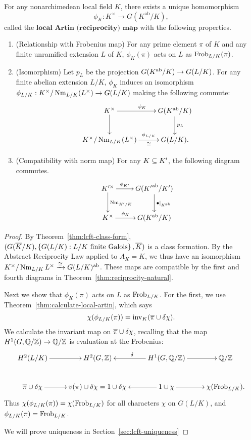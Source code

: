 \begin{thm*}
For any nonarchimedean local field $K$, there exists a unique homomorphism
\[
\phi_K:K^{\times} \to G(K^{\text{ab}}/K),
\]
called the $\textbf{local Artin (reciprocity) map}$
with the following properties.
\begin{enumerate}
\item (Relationship with Frobenius map)
For any prime element $\pi$ of $K$ and any finite unramified extension $L$ of $K$, $\phi_K(\pi)$ acts on $L$ as $\operatorname{Frob}_{L/K}(\pi)$.
\item (Isomorphism)
Let $p_{L}$ be the projection $G(K^{\text{ab}}/K)\to G(L/K)$. For any finite abelian extension $L/K$, %
$\phi_K$ induces an isomorphism $\phi_{L/K}:K^{\times}/\operatorname{Nm}_{L/K}(L^{\times})\to G(L/K)$ making the following commute:
\[
\xymatrix{
K^{\times} \ar[r]^{\phi_K}\ar[d] & G(K^{\text{ab}}/K)\ar[d]^{p_L}\\
K^{\times}/\nm_{L/K}(L^{\times})\ar[r]^-{\phi_{L/K}}_-{\cong} & G(L/K).
}
\]
\item (Compatibility with norm map) For any $K\subseteq K'$, the following diagram commutes.
\[
\xymatrix{
K'^{\times} \ar[r]^-{\phi_{K'}} \ar[d]^{\nm_{K'/K}} & G({K'}\abe/K')\ar[d]^{\bullet|_{K\abe}}\\
K^{\times} \ar[r]^-{\phi_{K}}& G(K\abe/K)
}
\]
\end{enumerate}
\end{thm*}
\begin{proof}
By Theorem~\ref{thm:lcft-class-form}, $(G(\overline{K}/K),\left\{{G(L/K)}:{L/K\text{ finite Galois}}\right\},\overline{K})$ is a class formation. By the Abstract Reciprocity Law applied to $A_K=K$, we thus have an isomorphism $K^{\times}/\operatorname{Nm}_{L/K}L^{\times}\xrightarrow{\cong} G(L/K)^{\text{ab}}$. These maps are compatible by the first and fourth diagrams in Theorem~\ref{thm:reciprocity-natural}.

Next we show that $\phi_K(\pi)$ acts on $L$ as $\operatorname{Frob}_{L/K}$. For the first, we use Theorem~\ref{thm:calculate-local-artin}, which says
\[
\chi(\phi_{L/K}(\pi))=\operatorname{inv}_K(\overline{\pi}\cup \delta \chi).
\]
We calculate the invariant map on $\overline{\pi}\cup \delta \chi$, recalling that the map $H^1(G,\mathbb{Q}/\mathbb{Z})\to \mathbb{Q}/\mathbb{Z}$ is evaluation at the Frobenius:
\[
\xymatrix{
H^2(L/K)\ar[r] & H^2(G,\Z) & H^1(G,\Q/\Z)\ar[l]_{\de} \ar[r] & \Q/\Z\\
\ol{\pi}\cup \de \chi \ar[r] & v(\pi)\cup \de \chi=1\cup \de \chi  & 1\cup \chi \ar[r]\ar[l] & \chi(\Frob_{L/K}).
}
\]
Thus $\chi(\phi_{L/K}(\pi))=\chi(\operatorname{Frob}_{L/K})$ for all characters $\chi$ on $G(L/K)$, and $\phi_{L/K}(\pi)=\operatorname{Frob}_{L/K}$.

We will prove uniqueness in Section~\ref{sec:lcft-uniqueness}
\end{proof}
